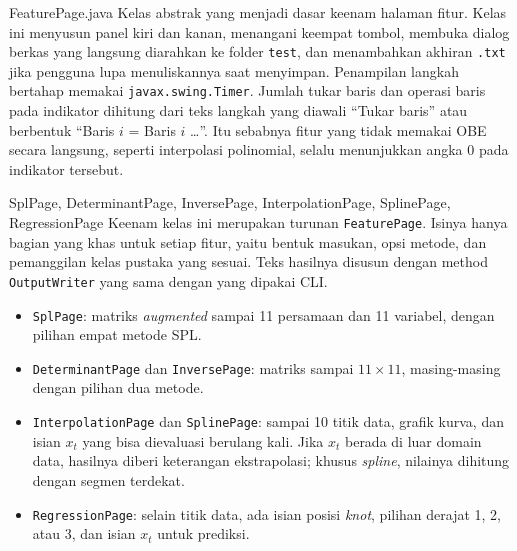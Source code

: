 \begin{kelas}{FeaturePage.java}
Kelas abstrak yang menjadi dasar keenam halaman fitur. Kelas ini menyusun panel kiri dan kanan, menangani keempat tombol, membuka dialog berkas yang langsung diarahkan ke folder \texttt{test}, dan menambahkan akhiran \texttt{.txt} jika pengguna lupa menuliskannya saat menyimpan. Penampilan langkah bertahap memakai \texttt{javax.swing.Timer}. Jumlah tukar baris dan operasi baris pada indikator dihitung dari teks langkah yang diawali ``Tukar baris'' atau berbentuk ``Baris $i$ = Baris $i$ \ldots''. Itu sebabnya fitur yang tidak memakai OBE secara langsung, seperti interpolasi polinomial, selalu menunjukkan angka 0 pada indikator tersebut.
 
 
 
 
 
\end{kelas}

\begin{kelas}{SplPage, DeterminantPage, InversePage, InterpolationPage, SplinePage, RegressionPage}
Keenam kelas ini merupakan turunan \texttt{FeaturePage}. Isinya hanya bagian yang khas untuk setiap fitur, yaitu bentuk masukan, opsi metode, dan pemanggilan kelas pustaka yang sesuai. Teks hasilnya disusun dengan method \texttt{OutputWriter} yang sama dengan yang dipakai CLI.
\begin{itemize}
\item \texttt{SplPage}: matriks \textit{augmented} sampai 11 persamaan dan 11 variabel, dengan pilihan empat metode SPL.
\item \texttt{DeterminantPage} dan \texttt{InversePage}: matriks sampai $11 \times 11$, masing-masing dengan pilihan dua metode.
\item \texttt{InterpolationPage} dan \texttt{SplinePage}: sampai 10 titik data, grafik kurva, dan isian $x_t$ yang bisa dievaluasi berulang kali. Jika $x_t$ berada di luar domain data, hasilnya diberi keterangan ekstrapolasi; khusus \textit{spline}, nilainya dihitung dengan segmen terdekat.
\item \texttt{RegressionPage}: selain titik data, ada isian posisi \textit{knot}, pilihan derajat 1, 2, atau 3, dan isian $x_t$ untuk prediksi.
\end{itemize}
\end{kelas}


